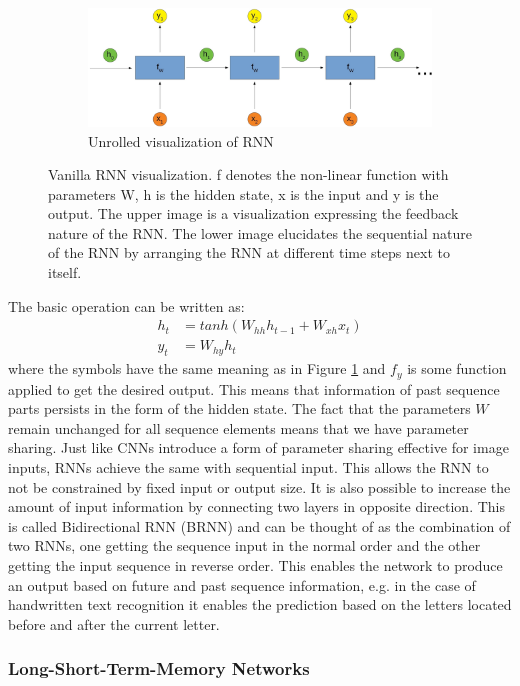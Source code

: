 \documentclass{article}
\begin{document}
\begin{figure}[H]
\begin{subfigure}{1\textwidth}
        \centering
        \includegraphics[scale=0.2]{rsz_rnn_unroll2}
        \caption{Unrolled visualization of RNN}
    \end{subfigure}
    \caption{Vanilla RNN visualization. f denotes the non-linear function with parameters W, h is the hidden state, x is the input and y is the output. The upper image is a visualization expressing the feedback nature of the RNN. The lower image elucidates the sequential nature of the RNN by arranging the RNN at different time steps next to itself.}
\label{fig:RNNArchitecture}
\end{figure}
The basic operation can be written as:
\[
\begin{split}
h_t &= tanh(W_{hh} h_{t-1} + W_{xh} x_t)\\
y_t &= W_{hy} h_t
\end{split}
\]
where the symbols have the same meaning as in Figure \ref{fig:RNNArchitecture} and \(f_y\) is some function applied to get the desired output. This means that information of past sequence parts persists in the form of the hidden state. The fact that the parameters \(W\) remain unchanged for all sequence elements means that we have parameter sharing. Just like CNNs introduce a form of parameter sharing effective for image inputs, RNNs achieve the same with sequential input. This allows the RNN to not be constrained by fixed input or output size. It is also possible to increase the amount of input information by connecting two layers in opposite direction. This is called Bidirectional RNN (BRNN) and can be thought of as the combination of two RNNs, one getting the sequence input in the normal order and the other getting the input sequence in reverse order. This enables the network to produce an output based on future and past sequence information, e.g. in the case of handwritten text recognition it enables the prediction based on the letters located before and after the current letter.
\subsubsection{Long-Short-Term-Memory Networks}
\end{document}
